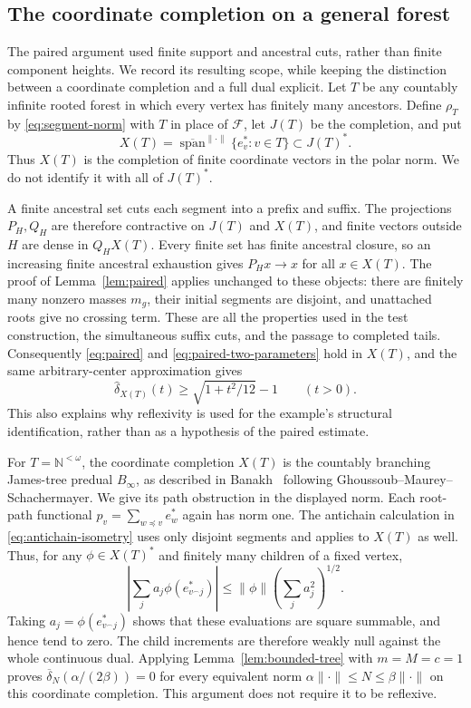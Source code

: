\subsection{The coordinate completion on a general forest}
\label{sec:general-forest}

The paired argument used finite support and ancestral cuts, rather than
finite component heights. We record its resulting scope, while keeping
the distinction between a coordinate completion and a full dual explicit.
Let $T$ be any countably infinite rooted forest in which every vertex
has finitely many ancestors. Define $\rho_T$ by \eqref{eq:segment-norm}
with $T$ in place of $\mathcal F$, let $J(T)$ be the completion, and put
\[
 X(T)=\overline{\operatorname{span}}^{\|\cdot\|}\{e_v^*:v\in T\}
 \subset J(T)^*.
\]
Thus $X(T)$ is the completion of finite coordinate vectors in the polar
norm. We do not identify it with all of $J(T)^*$.

A finite ancestral set cuts each segment into a prefix and suffix.
The projections $P_H,Q_H$ are therefore contractive on $J(T)$ and
$X(T)$, and finite vectors outside $H$ are dense in $Q_HX(T)$.
Every finite set has finite ancestral closure, so an increasing finite
ancestral exhaustion gives $P_Hx\to x$ for all $x\in X(T)$.
The proof of Lemma~\ref{lem:paired} applies unchanged to these objects:
there are finitely many nonzero masses $m_g$, their initial segments
are disjoint, and unattached roots give no crossing term. These are
all the properties used in the test construction, the simultaneous
suffix cuts, and the passage to completed tails. Consequently
\eqref{eq:paired} and \eqref{eq:paired-two-parameters} hold in $X(T)$,
and the same arbitrary-center approximation gives
\begin{equation}\label{eq:general-forest-modulus}
 \widehat\delta_{X(T)}(t)\ge\sqrt{1+t^2/12}-1\qquad(t>0).
\end{equation}
This also explains why reflexivity is used for the example's structural
identification, rather than as a hypothesis of the paired estimate.

For $T=\mathbb N^{<\omega}$, the coordinate completion $X(T)$ is
the countably branching James-tree predual $B_\infty$, as described
in Banakh~\cite[\S2.II]{Banakh2000} following
Ghoussoub--Maurey--Schachermayer. We give its path obstruction in
the displayed norm. Each root-path
functional $p_v=\sum_{w\preceq v}e_w^*$ again has norm one. The
antichain calculation in \eqref{eq:antichain-isometry} uses only
disjoint segments and applies to $X(T)$ as well. Thus, for any
$\phi\in X(T)^*$ and finitely many children of a fixed vertex,
\[
 \left|\sum_j a_j\phi(e_{v^\frown j}^*)\right|
 \le\|\phi\|\left(\sum_j a_j^2\right)^{1/2}.
\]
Taking $a_j=\phi(e_{v^\frown j}^*)$ shows that these evaluations are
square summable, and hence tend to zero. The child increments are
therefore weakly null against the whole continuous dual. Applying
Lemma~\ref{lem:bounded-tree} with $m=M=c=1$ proves
$\overline\delta_N(\alpha/(2\beta))=0$ for every equivalent norm
$\alpha\|\cdot\|\le N\le\beta\|\cdot\|$ on this coordinate
completion. This argument does not require it to be reflexive.
